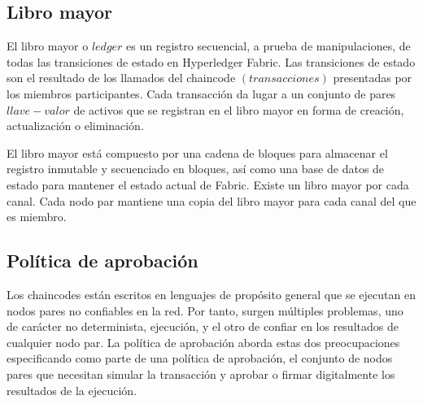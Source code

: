 \subsection{Libro mayor}
El libro mayor o $ledger$ es un registro secuencial, a prueba de manipulaciones, de todas las transiciones de estado en Hyperledger Fabric. Las transiciones de estado son el resultado de los llamados del chaincode $(transacciones)$ presentadas por los miembros participantes. Cada transacci\'on da lugar a un conjunto de pares $llave-valor$ de activos que se registran en el libro mayor en forma de creaci\'on, actualizaci\'on o eliminaci\'on.

El libro mayor est\'a compuesto por una cadena de bloques para almacenar el registro inmutable y secuenciado en bloques, as\'i como una base de datos de estado para mantener el estado actual de Fabric. Existe un libro mayor por cada canal. Cada nodo par mantiene una copia del libro mayor para cada canal del que es miembro.

\subsection{Pol\'itica de aprobaci\'on}
Los chaincodes est\'an escritos en lenguajes de prop\'osito general que se ejecutan en nodos pares no confiables en la red. Por tanto, surgen m\'ultiples problemas, uno de car\'acter no determinista, ejecuci\'on, y el otro de confiar en los resultados de cualquier nodo par. La pol\'itica de aprobaci\'on aborda estas dos preocupaciones especificando como parte de una pol\'itica de aprobaci\'on, el conjunto de nodos pares que necesitan simular la transacci\'on y aprobar o firmar digitalmente los resultados de la ejecuci\'on.

